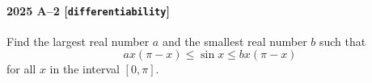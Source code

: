 \paragraph{2025 A--2 \textnormal{[\texttt{differentiability}]}}
Find the largest real number $a$ and the smallest real number $b$ such that
\[
ax(\pi-x) \leq \sin x \leq bx(\pi-x)
\]
for all $x$ in the interval $[0, \pi]$.
